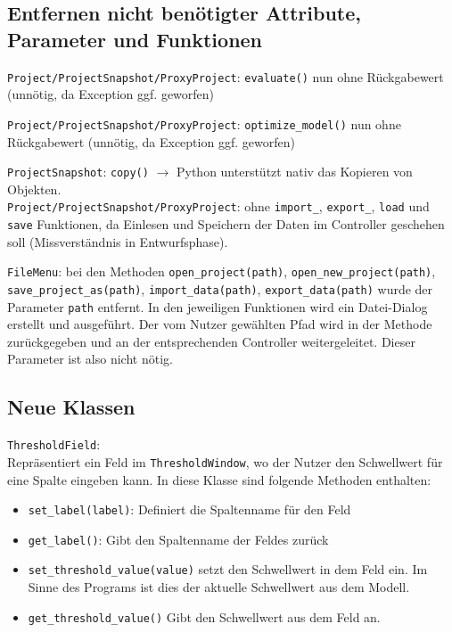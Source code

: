 \documentclass{article}
\newcommand{\classref}[1]{\texttt{#1}}
\begin{document}
\subsection{Entfernen nicht benötigter Attribute, Parameter und Funktionen}

\classref{Project/ProjectSnapshot/ProxyProject}: \texttt{evaluate()} nun ohne Rückgabewert (unnötig, da Exception ggf. geworfen) \newline

\classref{Project/ProjectSnapshot/ProxyProject}: \texttt{optimize\_model()} nun ohne Rückgabewert (unnötig, da Exception ggf. geworfen) \newline

\classref{ProjectSnapshot}: \texttt{copy()} $\rightarrow$ Python unterstützt nativ das Kopieren von Objekten.\\

\classref{Project/ProjectSnapshot/ProxyProject}: ohne \texttt{import\_}, \texttt{export\_}, \texttt{load} und \texttt{save} Funktionen, da Einlesen und Speichern der Daten im Controller geschehen soll (Missverständnis in Entwurfsphase). \newline

\classref{FileMenu}: bei den Methoden \texttt{open\_project(path)}, \texttt{open\_new\_project(path)}, \texttt{save\_project\_as(path)}, \texttt{import\_data(path)}, \texttt{export\_data(path)} wurde der Parameter \texttt{path} entfernt. In den jeweiligen Funktionen wird ein Datei-Dialog erstellt und ausgeführt. Der vom Nutzer gewählten Pfad wird in der Methode zurückgegeben und an der entsprechenden Controller weitergeleitet. Dieser Parameter ist also nicht nötig.

\subsection{Neue Klassen}
\classref{ThresholdField}: \\Repräsentiert ein Feld im \classref{ThresholdWindow}, wo der Nutzer den Schwellwert für eine Spalte eingeben kann. In diese Klasse sind folgende Methoden enthalten:
\begin{itemize}
    \item \texttt{set\_label(label)}: Definiert die Spaltenname für den Feld
    \item  \texttt{get\_label()}: Gibt den Spaltenname der Feldes zurück
    \item \texttt{set\_threshold\_value(value)} setzt den Schwellwert in dem Feld ein. Im Sinne des Programs ist dies der aktuelle Schwellwert aus dem Modell.
    \item \texttt{get\_threshold\_value()} Gibt den Schwellwert aus dem Feld an.
\end{itemize}
\end{document}
